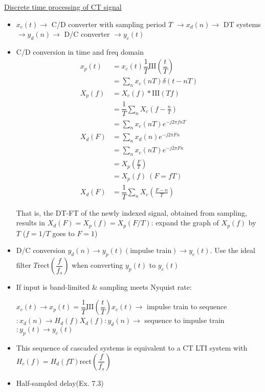\documentclass{article}
\newcommand{\shah}[1]{\mathrm{III}\left(#1\right)}
\newcommand{\rect}[1]{\mathrm{rect}\left(#1\right)}
\begin{document}
\underline{Discrete time processing of CT signal}
\begin{itemize}
    \item $x_c(t)\rightarrow$ C/D converter with sampling period $T$ $\rightarrow x_d(n)\rightarrow$ DT systems $\rightarrow y_d(n)\rightarrow$ D/C converter $\rightarrow y_c(t)$
    \item C/D conversion in time and freq domain
    \begin{align*}
        x_p(t)&=x_c(t)\dfrac{1}{T}\shah{\dfrac{t}{T}}\\ &=\sum_n x_c(nT)\delta(t-nT)\\
        X_p(f)&=X_c(f)*\shah{Tf}\\&=\dfrac{1}{T}\sum_n X_c\left(f-\frac{n}{T}\right)\\&=\sum_n x_c(nT)e^{-j2\pi fnT}\\
        X_d(F)&=\sum_n x_d(n)e^{-j2\pi Fn}\\&=\sum_n x_c(nT)e^{-j2\pi Fn}\\&=X_p\left(\frac{F}{T}\right)\\&=X_p(f)\:(F=fT)\\
       X_d(F)&=\dfrac{1}{T}\sum_n X_c\left(\frac{F-n}{T}\right)
    \end{align*}
    
    That is, the DT-FT of the newly indexed signal, obtained from sampling, results in $X_d(F)=X_p(f)=X_p(F/T)$: expand the graph of $X_p(f)$ by $T$ ($f=1/T$ goes to $F=1$)
    
    \item D/C conversion
    $y_d(n)\rightarrow y_p(t)(\text{impulse train})\rightarrow y_c(t)$. Use the ideal filter $T\rect{\dfrac{f}{f_s}}$ when converting $y_p(t)$ to $y_c(t)$
    \item If input is band-limited \& sampling meets Nyquist rate:
    
    $x_c(t)\rightarrow x_p(t)=\dfrac{1}{T}\shah{\dfrac{t}{T}}x_c(t)\rightarrow$ impulse train to sequence $:x_d(n)\rightarrow H_d(f)X_d(f): y_d(n)\rightarrow$ sequence to impulse train$:y_p(t) \rightarrow y_c(t)$
    \item This sequence of cascaded systems is equivalent to a CT LTI system with $H_c(f)=H_d(fT)\rect{\dfrac{f}{f_s}}$
    \item Half-sampled delay(Ex. 7.3)
\end{itemize}
\end{document}
